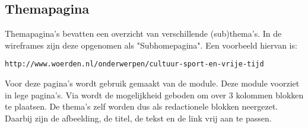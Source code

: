 \subsection{Themapagina}\label{themapagina}

Themapagina's bevatten een overzicht van verschillende (sub)thema's. In de wireframes zijn deze opgenomen als "Subhomepagina". Een voorbeeld hiervan is:
\begin{verbatim}
http://www.woerden.nl/onderwerpen/cultuur-sport-en-vrije-tijd
\end{verbatim}
Voor deze pagina's wordt gebruik gemaakt van de  module. Deze module voorziet in lege pagina's. Via  wordt de mogelijkheid geboden om over 3 kolommen blokken te plaatsen. De thema's zelf worden dus als redactionele blokken neergezet. Daarbij zijn de afbeelding, de titel, de tekst en de link vrij aan te passen.
